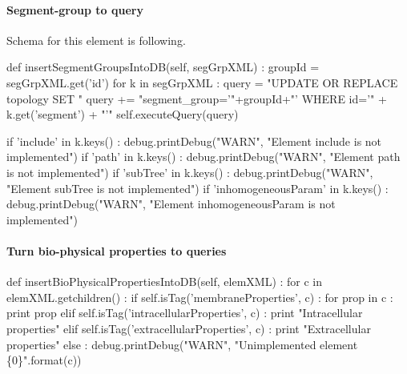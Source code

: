 \documentclass[]{article}%
\begin{document}
\paragraph{Segment-group to query}
  
  Schema for this element is following.



\nwenddocs{}\plusendmoddef\nwstartdeflinemarkup{}\nwenddeflinemarkup
def insertSegmentGroupsIntoDB(self, segGrpXML) :
    groupId = segGrpXML.get('id')
    for k in segGrpXML :
      query = "UPDATE OR REPLACE topology SET "
      query += "segment_group='"+groupId+"' WHERE id='" + k.get('segment') + "'"
      self.executeQuery(query)

      if 'include' in k.keys() : 
        debug.printDebug("WARN", "Element include is not implemented")
      if 'path' in k.keys() : 
        debug.printDebug("WARN", "Element path is not implemented")
      if 'subTree' in k.keys() :
        debug.printDebug("WARN", "Element subTree is not implemented")
      if 'inhomogeneousParam' in k.keys() : 
        debug.printDebug("WARN", "Element inhomogeneousParam is not implemented")

\eatline
{}\nwendcode{}\nwdocspar
\paragraph{Turn bio-physical properties to queries}

\nwenddocs{}\plusendmoddef\nwstartdeflinemarkup{}\nwenddeflinemarkup
def insertBioPhysicalPropertiesIntoDB(self, elemXML) :
    for c in elemXML.getchildren() :
      if self.isTag('membraneProperties', c) :
        for prop in c :
          print prop
      elif self.isTag('intracellularProperties', c) :
        print "Intracellular properties"
      elif self.isTag('extracellularProperties', c) :
        print "Extracellular properties"
      else :
        debug.printDebug("WARN", "Unimplemented element \{0\}".format(c))
\end{document}
